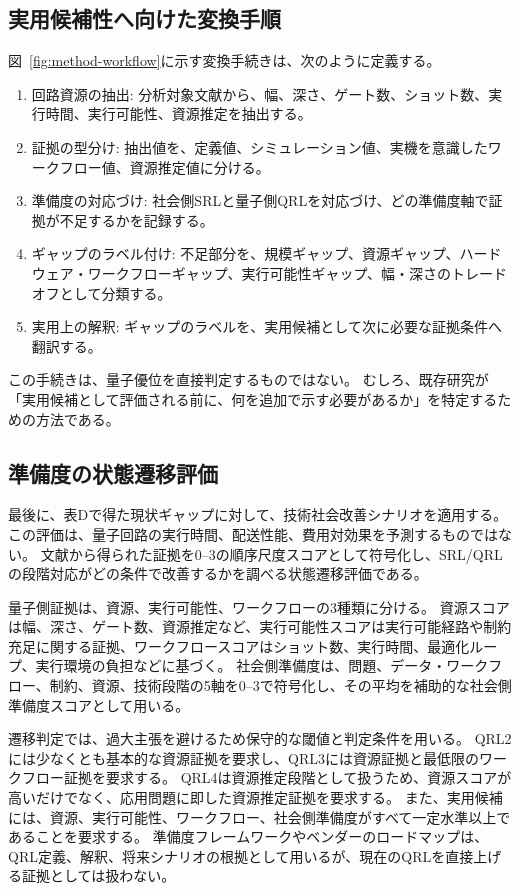 \subsection{実用候補性へ向けた変換手順}

図~\ref{fig:method-workflow}に示す変換手続きは、次のように定義する。

\begin{enumerate}
  \item 回路資源の抽出: 分析対象文献から、幅、深さ、ゲート数、ショット数、実行時間、実行可能性、資源推定を抽出する。
  \item 証拠の型分け: 抽出値を、定義値、シミュレーション値、実機を意識したワークフロー値、資源推定値に分ける。
  \item 準備度の対応づけ: 社会側SRLと量子側QRLを対応づけ、どの準備度軸で証拠が不足するかを記録する。
  \item ギャップのラベル付け: 不足部分を、規模ギャップ、資源ギャップ、ハードウェア・ワークフローギャップ、実行可能性ギャップ、幅・深さのトレードオフとして分類する。
  \item 実用上の解釈: ギャップのラベルを、実用候補として次に必要な証拠条件へ翻訳する。
\end{enumerate}

この手続きは、量子優位を直接判定するものではない。
むしろ、既存研究が「実用候補として評価される前に、何を追加で示す必要があるか」を特定するための方法である。

\subsection{準備度の状態遷移評価}

最後に、表Dで得た現状ギャップに対して、技術社会改善シナリオを適用する。
この評価は、量子回路の実行時間、配送性能、費用対効果を予測するものではない。
文献から得られた証拠を0--3の順序尺度スコアとして符号化し、SRL/QRLの段階対応がどの条件で改善するかを調べる状態遷移評価である。

量子側証拠は、資源、実行可能性、ワークフローの3種類に分ける。
資源スコアは幅、深さ、ゲート数、資源推定など、実行可能性スコアは実行可能経路や制約充足に関する証拠、ワークフロースコアはショット数、実行時間、最適化ループ、実行環境の負担などに基づく。
社会側準備度は、問題、データ・ワークフロー、制約、資源、技術段階の5軸を0--3で符号化し、その平均を補助的な社会側準備度スコアとして用いる。

遷移判定では、過大主張を避けるため保守的な閾値と判定条件を用いる。
QRL2には少なくとも基本的な資源証拠を要求し、QRL3には資源証拠と最低限のワークフロー証拠を要求する。
QRL4は資源推定段階として扱うため、資源スコアが高いだけでなく、応用問題に即した資源推定証拠を要求する。
また、実用候補には、資源、実行可能性、ワークフロー、社会側準備度がすべて一定水準以上であることを要求する。
準備度フレームワークやベンダーのロードマップは、QRL定義、解釈、将来シナリオの根拠として用いるが、現在のQRLを直接上げる証拠としては扱わない。


